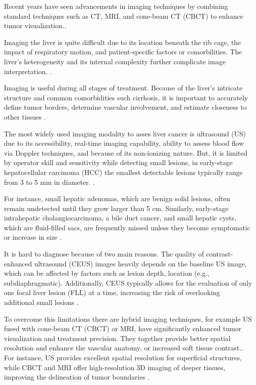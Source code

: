 
Recent years have seen advancements in imaging techniques by combining standard techniques such as CT, MRI, and cone-beam CT (CBCT) to enhance tumor visualization.\cite{floridi2022}.

Imaging the liver is quite difficult due to its location beneath the rib cage, the impact of respiratory motion, and patient-specific factors or comorbilities. The liver’s heterogeneity and its internal complexity further complicate image interpretation. \cite{ferraioli2018}.

Imaging is useful during all stages of treatment. Because of the liver's intricate structure and common comorbidities such cirrhosis, it is important to accurately define tumor borders, determine vascular involvement, and estimate closeness to other tissues \cite{floridi2022}.

The most widely used imaging modality to asses liver cancer is ultrasound (US) due to its accessibility, real-time imaging capability, ability to assess blood flow via Doppler techniques, and because of its non-ionizing nature. But, it is limited by operator skill and sensitivity while detecting small lesions, in early-stage hepatocellular carcinoma (HCC) the smallest detectable lesions typically range from 3 to 5 mm in diameter. \cite{mcmahon2023,ferraioli2018}. 

For instance, small hepatic adenomas, which are benign solid lesions, often remain undetected until they grow larger than 5 cm. Similarly, early-stage intrahepatic cholangiocarcinoma, a bile duct cancer, and small hepatic cysts, which are fluid-filled sacs, are frequently missed unless they become symptomatic or increase in size \cite{tre777}. 

It is hard to diagnose because of two main reasons. The quality of contrast-enhanced ultrasound (CEUS) images heavily depends on the baseline US image, which can be affected by factors such as lesion depth, location (e.g., subdiaphragmatic). Additionally, CEUS typically allows for the evaluation of only one focal liver lesion (FLL) at a time, increasing the risk of overlooking additional small lesions \cite{pmc5588445}.

To overcome this limitations there are hybrid imaging techniques, for example US fused with cone-beam CT (CBCT) or MRI, have significantly enhanced tumor visualization and treatment precision. They together provide better spatial resolution and enhance the vascular anatomy, or increased soft tissue contrast.\cite{floridi2022}.  For instance, US provides excellent spatial resolution for superficial structures, while CBCT and MRI offer high-resolution 3D imaging of deeper tissues, improving the delineation of tumor boundaries \cite{pmc3016679}.

